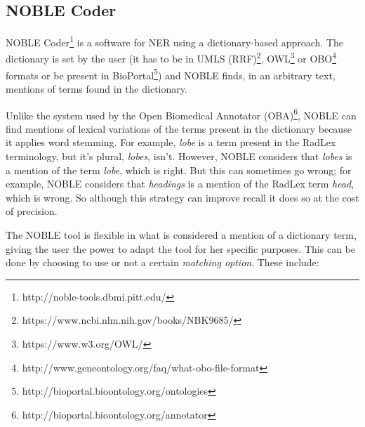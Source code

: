 


\subsection{NOBLE Coder}

NOBLE Coder\footnote{http://noble-tools.dbmi.pitt.edu/} \citep{Tseytlin2016} is a software for NER using a dictionary-based approach. The dictionary is set by the user (it  has to be in UMLS (RRF)\footnote{https://www.ncbi.nlm.nih.gov/books/NBK9685/}, OWL\footnote{https://www.w3.org/OWL/} or OBO\footnote{http://www.geneontology.org/faq/what-obo-file-format} formats or be present in BioPortal\footnote{http://bioportal.bioontology.org/ontologies}) and NOBLE finds, in an arbitrary text, mentions of terms found in the dictionary.

Unlike the system used by the Open Biomedical Annotator (OBA)\footnote{http://bioportal.bioontology.org/annotator}\citep{Jonquet2009}, NOBLE can find mentions of lexical variations of the terms present in the dictionary because it applies word stemming. For example, \textit{lobe} is a term present in the RadLex terminology, but it's plural, \textit{lobes}, isn't. However, NOBLE considers that \textit{lobes} is a mention of the term \textit{lobe}, which is right. But this can sometimes go wrong; for example, NOBLE considers that \textit{headings} is a mention of the RadLex term \textit{head}, which is wrong. So although this strategy can improve recall it does so at the cost of precision. 

The NOBLE tool is flexible in what is considered a mention of a dictionary term, giving the user the power to adapt the tool for her specific purposes. This can be done by choosing to use or not a certain \textit{matching option}. These include:

